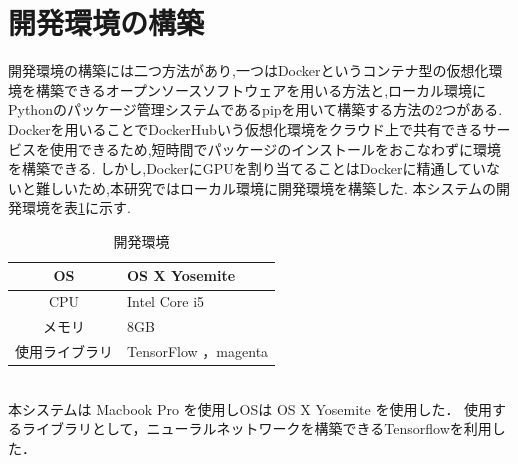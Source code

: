 \section{開発環境の構築}
開発環境の構築には二つ方法があり,一つはDockerというコンテナ型の仮想化環境を構築できるオープンソースソフトウェアを用いる方法と,ローカル環境にPythonのパッケージ管理システムであるpipを用いて構築する方法の2つがある.\\
Dockerを用いることでDockerHubいう仮想化環境をクラウド上で共有できるサービスを使用できるため,短時間でパッケージのインストールをおこなわずに環境を構築できる.
しかし,DockerにGPUを割り当てることはDockerに精通していないと難しいため,本研究ではローカル環境に開発環境を構築した.
本システムの開発環境を表\ref{tab:開発環境}に示す.
\begin{table}[h]
    \begin{center}
    \caption{開発環境}
    \label{tab:開発環境}
    \begin{tabular}{|c|p{}|}
    \hline
    OS & OS X Yosemite\\
    \hline
    CPU & Intel Core i5\\
    \hline
    メモリ & 8GB\\
    \hline
    使用ライブラリ & TensorFlow ，magenta\\
    \hline
    \end{tabular}
    \end{center}
\end{table}\\
本システムは Macbook Pro を使用しOSは OS X Yosemite を使用した．
使用するライブラリとして，ニューラルネットワークを構築できるTensorflowを利用した．